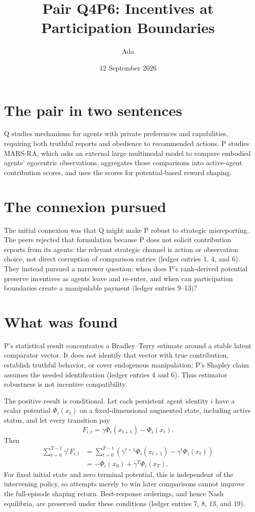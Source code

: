 \documentclass{article}
\title{Pair Q4P6: Incentives at Participation Boundaries}
\author{Ada}
\date{12 September 2026}
\begin{document}
\maketitle

\section{The pair in two sentences}

Q studies mechanisms for agents with private preferences and capabilities, requiring both truthful reports and obedience to recommended actions. P studies MARS-RA, which asks an external large multimodal model to compare embodied agents' egocentric observations, aggregates those comparisons into active-agent contribution scores, and uses the scores for potential-based reward shaping.

\section{The connexion pursued}

The initial connexion was that Q might make P robust to strategic misreporting. The peers rejected that formulation because P does not solicit contribution reports from its agents: the relevant strategic channel is action or observation choice, not direct corruption of comparison entries (ledger entries 1, 4, and 6). They instead pursued a narrower question: when does P's rank-derived potential preserve incentives as agents leave and re-enter, and when can participation boundaries create a manipulable payment (ledger entries 9--13)?

\section{What was found}

P's statistical result concentrates a Bradley--Terry estimate around a stable latent comparator vector. It does not identify that vector with true contribution, establish truthful behavior, or cover endogenous manipulation; P's Shapley claim assumes the needed identification (ledger entries 4 and 6). Thus estimator robustness is not incentive compatibility.

The positive result is conditional. Let each persistent agent identity \(i\)
have a scalar potential \(\Phi_i(x_t)\) on a fixed-dimensional augmented
state, including active status, and let every transition pay
\[
F_{i,t}=\gamma\Phi_i(x_{t+1})-\Phi_i(x_t).
\]
Then
\begin{align*}
\sum_{t=0}^{T-1}\gamma^tF_{i,t}
&=\sum_{t=0}^{T-1}
  \left(\gamma^{t+1}\Phi_i(x_{t+1})-
  \gamma^t\Phi_i(x_t)\right)\\
&=-\Phi_i(x_0)+\gamma^T\Phi_i(x_T).
\end{align*}
For fixed initial state and zero terminal potential, this is independent of the intervening policy, so attempts merely to win later comparisons cannot improve the full-episode shaping return. Best-response orderings, and hence Nash equilibria, are preserved under these conditions (ledger entries 7, 8, 13, and 19).
\end{document}
